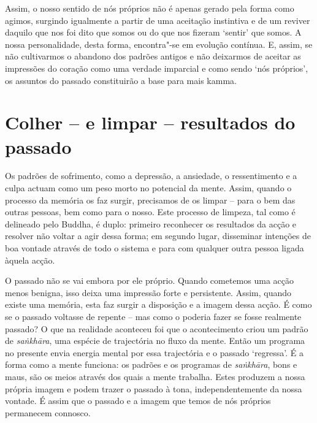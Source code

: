 Assim, o nosso sentido de nós próprios não é apenas gerado pela forma como
agimos, surgindo igualmente a partir de uma aceitação instintiva e de um reviver
daquilo que nos foi dito que somos ou do que nos fizeram `sentir' que somos. A
nossa personalidade, desta forma, encontra"-se em evolução contínua. E, assim, se
não cultivarmos o abandono dos padrões antigos e não deixarmos de aceitar as
impressões do coração como uma verdade imparcial e como sendo `nós próprios', os
assuntos do passado constituirão a base para mais kamma.

\section{Colher -- e limpar -- resultados do passado}

Os padrões de sofrimento, como a depressão, a ansiedade, o ressentimento e a
culpa actuam como um peso morto no potencial da mente. Assim, quando o processo
da memória os faz surgir, precisamos de os limpar -- para o bem das outras
pessoas, bem como para o nosso. Este processo de limpeza, tal como é delineado
pelo Buddha, é duplo: primeiro reconhecer os resultados da acção e resolver não
voltar a agir dessa forma; em segundo lugar, disseminar intenções de boa vontade
através de todo o sistema e para com qualquer outra pessoa ligada àquela acção.

O passado não se vai embora por ele próprio. Quando cometemos uma acção menos
benigna, isso deixa uma impressão forte e persistente. Assim, quando existe uma
memória, esta faz surgir a disposição e a imagem dessa acção. É como se o
passado voltasse de repente -- mas como o poderia fazer se fosse realmente
passado? O que na realidade aconteceu foi que o acontecimento criou um padrão de
\emph{saṅkhāra}, uma espécie de trajectória no fluxo da mente. Então um programa
no presente envia energia mental por essa trajectória e o passado `regressa'. É
a forma como a mente funciona: os padrões e os programas de \emph{saṅkhāra},
bons e maus, são os meios através dos quais a mente trabalha. Estes produzem a
nossa própria imagem e podem trazer o passado à tona, independentemente da nossa
vontade. É assim que o passado e a imagem que temos de nós próprios permanecem
connosco.

